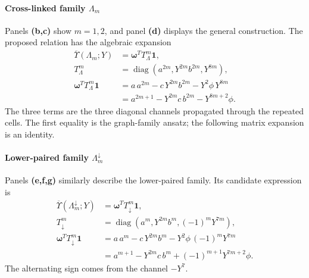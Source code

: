 \documentclass[10pt,twocolumn]{article}
\begin{document}
\paragraph{Cross-linked family $\Lambda_m$}
\label{supp:transfer_crosslinked}
Panels \textbf{(b,c)} show $m=1,2$, and panel \textbf{(d)} displays the general construction. The proposed relation has the algebraic expansion
\begin{equation}
\begin{aligned}
\overline{\Upsilon}(\Lambda_m;Y)&=\bm\omega^TT_\Lambda^m\bm1,\\
T_\Lambda^m&=\operatorname{diag}(a^{2m},Y^{2m}b^{2m},Y^{8m}),\\
\bm\omega^TT_\Lambda^m\bm1
&=a\,a^{2m}-c\,Y^{2m}b^{2m}-Y^2\phi\,Y^{8m}\\
&=\boxed{a^{2m+1}-Y^{2m}c\,b^{2m}-Y^{8m+2}\phi}.
\end{aligned}
\label{supp:deriv:eq:lambda_family}
\end{equation}
The three terms are the three diagonal channels propagated through the repeated cells. The first equality is the graph-family ansatz; the following matrix expansion is an identity.

\paragraph{Lower-paired family $\Lambda_m^{\downarrow}$}
\label{supp:transfer_lower_paired}
Panels \textbf{(e,f,g)} similarly describe the lower-paired family. Its candidate expression is
\begin{equation}
\begin{aligned}
\overline{\Upsilon}(\Lambda_m^{\downarrow};Y)&=\bm\omega^TT_\downarrow^m\bm1,\\
T_\downarrow^m&=\operatorname{diag}(a^m,Y^{2m}b^m,(-1)^mY^{7m}),\\
\bm\omega^TT_\downarrow^m\bm1
&=a\,a^m-c\,Y^{2m}b^m-Y^2\phi\,(-1)^mY^{7m}\\
&=\boxed{a^{m+1}-Y^{2m}c\,b^m+(-1)^{m+1}Y^{7m+2}\phi}.
\end{aligned}
\label{supp:deriv:eq:down_family}
\end{equation}
The alternating sign comes from the channel $-Y^7$.
\end{document}
